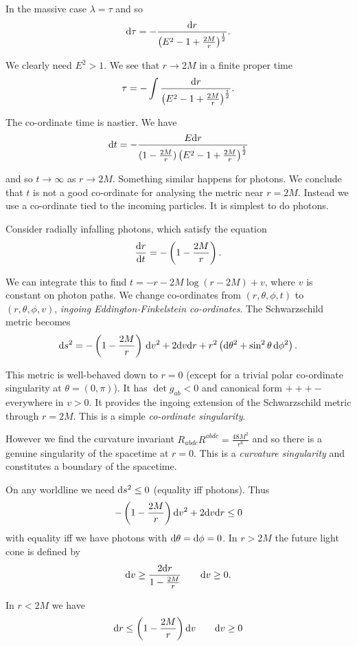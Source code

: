 \documentclass{notes}
\begin{document}
In the massive case $\lambda = \tau$ and so
\[
\mathrm{d} \tau = - \frac{\mathrm{d} r}{\left( E^2 - 1 + \tfrac{2 M}{r}
\right)^{\frac{1}{2}}}.
\]

We clearly need $E^2 > 1$.  We see that $r \to 2 M$ in a finite proper
time
\[
\tau = - \int \frac{\mathrm{d} r}{\left( E^2 - 1 + \tfrac{2 M}{r}
\right)^{\frac{1}{2}}}.
\]

The co-ordinate time is nastier.  We have
\[
\mathrm{d} t = - \frac{E \mathrm{d} r}{(1 - \frac{2 M}{r}) \left( E^2 - 1 +
    \tfrac{2 M}{r} \right)^{\frac{1}{2}}}
\]

and so $t \to \infty$ as $r \to 2 M$.  Something similar happens for
photons.  We conclude that $t$ is not a good co-ordinate for
analysing the metric near $r = 2 M$.  Instead we use a co-ordinate
tied to the incoming particles.  It is simplest to do photons.

Consider radially infalling photons, which satisfy the equation
\[
\frac{\mathrm{d} r}{\mathrm{d} t} = - \left( 1 - \frac{2 M}{r} \right).
\]

We can integrate this to find $t = -r - 2 M \log (r - 2M) + v$, where
$v$ is constant on photon paths.  We change co-ordinates from
$(r,\theta,\phi,t)$ to $(r,\theta,\phi,v)$, \emph{ingoing
  Eddington-Finkelstein co-ordinates}.  The Schwarzschild metric
becomes
\[
\mathrm{d} s^2 = - \left( 1- \frac{2 M}{r} \right)\, \mathrm{d} v^2 + 2 \mathrm{d} v \mathrm{d} r
+ r^2 \left( \mathrm{d} \theta^2 + \sin^2 \theta\, \mathrm{d} \phi^2\right).
\]

This metric is well-behaved down to $r = 0$ (except for
a trivial polar co-ordinate singularity at $\theta = (0,\pi)$).  It
has $\det g_{a b} < 0$ and canonical form $+++-$ everywhere in
$v > 0$.  It provides the ingoing extension of the Schwarzschild
metric through $r = 2 M$.  This is a simple \emph{co-ordinate singularity}.

However we find the curvature invariant
$R_{abdc}R^{a b d c} = \tfrac{48 M^2}{r^6}$
and so there is a genuine singularity of the spacetime at $r=0$.
This is a \emph{curvature singularity} and constitutes a boundary
of the spacetime.

On any worldline we need $\mathrm{d} s^2 \le 0$ (equality iff photons).  Thus
\[
- \left( 1 - \frac{2 M}{r} \right)\mathrm{d} v^2 + 2 \mathrm{d} v \mathrm{d} r \le 0
\]
with equality iff we have photons with $\mathrm{d} \theta = \mathrm{d} \phi = 0$.
In $r > 2 M$ the future light cone is defined by
\[
\mathrm{d} v \ge \frac{2 \mathrm{d} r}{1 - \frac{2 M}{r}} \qquad \mathrm{d} v \ge 0.
\]

\vspace{2in}

In $r < 2 M$ we have
\[
\mathrm{d} r \le \left( 1 - \frac{2 M}{r} \right)\mathrm{d} v \qquad \mathrm{d} v \ge 0
\]
\end{document}
